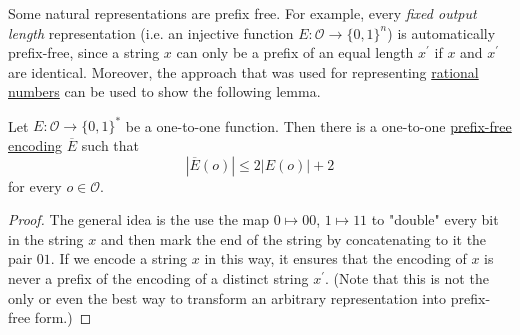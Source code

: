   Some natural representations are prefix free. For example, every \textit{fixed output length} representation (i.e. an injective function $E: \mathcal{O} \to \{0,1\}^n$) is automatically prefix-free, since a string $x$ can only be a prefix of an equal length $x^\prime$ if $x$ and $x^\prime$ are identical. Moreover, the approach that was used for representing \hyperref[alg-def:rational-numbers]{rational numbers} can be used to show the following lemma. 

  \begin{lemma}
    \label{thm:every-injective-encoding-has-a-prefix-free}
  Let $E: \mathcal{O} \to \{0,1\}^\ast$ be a one-to-one function. Then there is a one-to-one \hyperref[def:prefix-free-encoding]{prefix-free encoding} $\overline{E}$ such that 
  \begin{equation}
  | \overline{E}(o)| \leq 2 | E(o)| + 2
  \end{equation}
  for every $o \in \mathcal{O}$. 
  \end{lemma}
  \begin{proof}
  The general idea is the use the map $0 \mapsto 00$, $1 \mapsto 11$ to "double" every bit in the string $x$ and then mark the end of the string by concatenating to it the pair $01$. If we encode a string $x$ in this way, it ensures that the encoding of $x$ is never a prefix of the encoding of a distinct string $x^\prime$. (Note that this is not the only or even the best way to transform an arbitrary representation into prefix-free form.)
  \end{proof}


